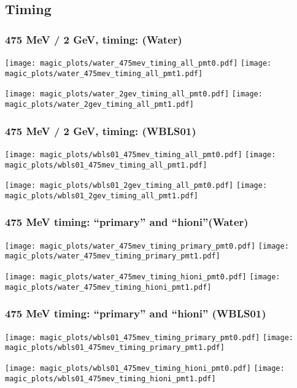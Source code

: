 \documentclass[xcolor=dvipsnames]{beamer}
\begin{document}
\subsection{Timing}

\begin{frame}[fragile]
  \frametitle{475 MeV / 2 GeV, timing: (Water)}

\texttt{[image: magic\_plots/water\_475mev\_timing\_all\_pmt0.pdf]}%
\texttt{[image: magic\_plots/water\_475mev\_timing\_all\_pmt1.pdf]}%

\texttt{[image: magic\_plots/water\_2gev\_timing\_all\_pmt0.pdf]}%
\texttt{[image: magic\_plots/water\_2gev\_timing\_all\_pmt1.pdf]}%
\end{frame}

\begin{frame}[fragile]
  \frametitle{475 MeV / 2 GeV, timing: (WBLS01)}

\texttt{[image: magic\_plots/wbls01\_475mev\_timing\_all\_pmt0.pdf]}%
\texttt{[image: magic\_plots/wbls01\_475mev\_timing\_all\_pmt1.pdf]}%

\texttt{[image: magic\_plots/wbls01\_2gev\_timing\_all\_pmt0.pdf]}%
\texttt{[image: magic\_plots/wbls01\_2gev\_timing\_all\_pmt1.pdf]}%
\end{frame}


\begin{frame}[fragile]
  \frametitle{475 MeV timing:  ``primary'' and ``hioni''(Water)}

\texttt{[image: magic\_plots/water\_475mev\_timing\_primary\_pmt0.pdf]}%
\texttt{[image: magic\_plots/water\_475mev\_timing\_primary\_pmt1.pdf]}%

\texttt{[image: magic\_plots/water\_475mev\_timing\_hioni\_pmt0.pdf]}%
\texttt{[image: magic\_plots/water\_475mev\_timing\_hioni\_pmt1.pdf]}%
\end{frame}

\begin{frame}[fragile]
  \frametitle{475 MeV timing: ``primary'' and ``hioni'' (WBLS01)}

\texttt{[image: magic\_plots/wbls01\_475mev\_timing\_primary\_pmt0.pdf]}%
\texttt{[image: magic\_plots/wbls01\_475mev\_timing\_primary\_pmt1.pdf]}%

\texttt{[image: magic\_plots/wbls01\_475mev\_timing\_hioni\_pmt0.pdf]}%
\texttt{[image: magic\_plots/wbls01\_475mev\_timing\_hioni\_pmt1.pdf]}%
\end{frame}
\end{document}
